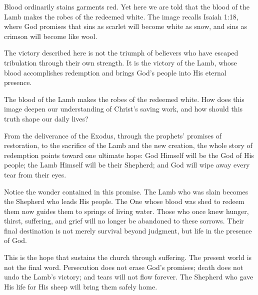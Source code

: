 Blood ordinarily stains garments red. Yet here we are told that the blood of the Lamb makes the robes of the redeemed white. The image recalls Isaiah 1:18, where God promises that sins as scarlet will become white as snow, and sins as crimson will become like wool.

The victory described here is not the triumph of believers who have escaped tribulation through their own strength. It is the victory of the Lamb, whose blood accomplishes redemption and brings God's people into His eternal presence.

\begin{ReaderQuestion}
The blood of the Lamb makes the robes of the redeemed white. How does this image deepen our understanding of Christ's saving work, and how should this truth shape our daily lives?
\end{ReaderQuestion}

From the deliverance of the Exodus, through the prophets' promises of restoration, to the sacrifice of the Lamb and the new creation, the whole story of redemption points toward one ultimate hope: God Himself will be the God of His people; the Lamb Himself will be their Shepherd; and God will wipe away every tear from their eyes.

Notice the wonder contained in this promise. The Lamb who was slain becomes the Shepherd who leads His people. The One whose blood was shed to redeem them now guides them to springs of living water. Those who once knew hunger, thirst, suffering, and grief will no longer be abandoned to these sorrows. Their final destination is not merely survival beyond judgment, but life in the presence of God.

This is the hope that sustains the church through suffering. The present world is not the final word. Persecution does not erase God's promises; death does not undo the Lamb's victory; and tears will not flow forever. The Shepherd who gave His life for His sheep will bring them safely home.
